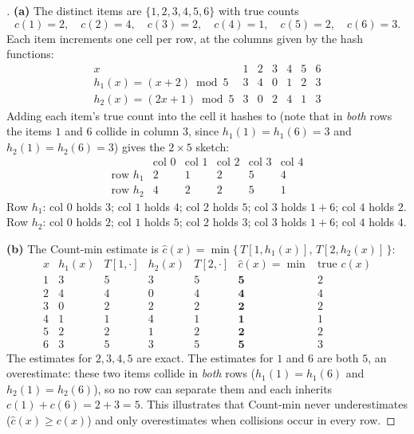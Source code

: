 \documentclass[en,hazy,blue,12pt,normal]{../../elegantnote}
\begin{document}
\begin{proof}[\solutionname]
\textbf{(a)}\; The distinct items are $\{1,2,3,4,5,6\}$ with true counts
\[
c(1)=2,\quad c(2)=4,\quad c(3)=2,\quad c(4)=1,\quad c(5)=2,\quad c(6)=3 .
\]
Each item increments one cell per row, at the columns given by the hash functions:
\[
\begin{array}{c|cccccc}
x & 1 & 2 & 3 & 4 & 5 & 6\\\hline
h_1(x)=(x+2)\bmod 5 & 3 & 4 & 0 & 1 & 2 & 3\\
h_2(x)=(2x+1)\bmod 5 & 3 & 0 & 2 & 4 & 1 & 3
\end{array}
\]
Adding each item's true count into the cell it hashes to (note that in \emph{both} rows the items
$1$ and $6$ collide in column $3$, since $h_1(1)=h_1(6)=3$ and $h_2(1)=h_2(6)=3$) gives the
$2\times 5$ sketch:
\[
\begin{array}{c|ccccc}
 & \text{col }0 & \text{col }1 & \text{col }2 & \text{col }3 & \text{col }4\\\hline
\text{row }h_1 & 2 & 1 & 2 & 5 & 4\\
\text{row }h_2 & 4 & 2 & 2 & 5 & 1
\end{array}
\]
Row $h_1$: col $0$ holds $3$; col $1$ holds $4$; col $2$ holds $5$; col $3$ holds $1{+}6$; col $4$ holds $2$.
Row $h_2$: col $0$ holds $2$; col $1$ holds $5$; col $2$ holds $3$; col $3$ holds $1{+}6$; col $4$ holds $4$.

\medskip
\textbf{(b)}\; The Count-min estimate is $\hat c(x)=\min\{\,T[1,h_1(x)],\,T[2,h_2(x)]\,\}$:
\[
\begin{array}{c|ccccc|c}
x & h_1(x) & T[1,\cdot] & h_2(x) & T[2,\cdot] & \hat c(x)=\min & \text{true } c(x)\\\hline
1 & 3 & 5 & 3 & 5 & \mathbf{5} & 2\\
2 & 4 & 4 & 0 & 4 & \mathbf{4} & 4\\
3 & 0 & 2 & 2 & 2 & \mathbf{2} & 2\\
4 & 1 & 1 & 4 & 1 & \mathbf{1} & 1\\
5 & 2 & 2 & 1 & 2 & \mathbf{2} & 2\\
6 & 3 & 5 & 3 & 5 & \mathbf{5} & 3
\end{array}
\]
The estimates for $2,3,4,5$ are exact. The estimates for $1$ and $6$ are both $5$, an
overestimate: these two items collide in \emph{both} rows ($h_1(1)=h_1(6)$ and $h_2(1)=h_2(6)$),
so no row can separate them and each inherits $c(1)+c(6)=2+3=5$. This illustrates that Count-min
never underestimates ($\hat c(x)\ge c(x)$) and only overestimates when collisions occur in every row.
\end{proof}
\end{document}
